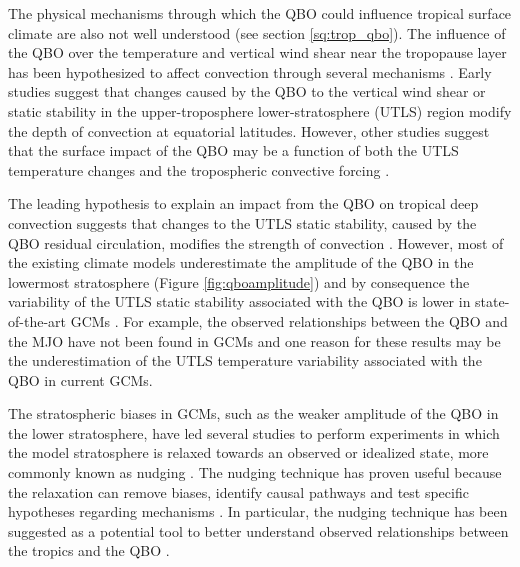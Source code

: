 The physical mechanisms through which the QBO could influence tropical surface climate are also not well understood (see section \ref{sq:trop_qbo}). The influence of the QBO over the temperature and vertical wind shear near the tropopause layer \citep{tegtmeier2020b,martin2021variability} has been hypothesized to affect convection through several mechanisms \citep{haynes2021influence}.
Early studies \citep{gray1984,collimore2003} suggest that changes caused by the QBO to the vertical wind shear or static stability in the upper-troposphere lower-stratosphere (UTLS) region  modify the depth of convection at equatorial latitudes. However, other studies suggest that the surface impact of the QBO may be a function of both the UTLS temperature changes and the tropospheric convective forcing \citep{nie2015}.

The leading hypothesis to explain an impact from the QBO on tropical deep convection suggests that changes to the  UTLS static stability, caused by the QBO residual circulation, modifies the strength of convection  \citep{collimore2003,liess2012,nie2015,yamazaki2020tropospheric}. 
However, most of the existing climate models underestimate the amplitude of the QBO in the lowermost stratosphere (Figure \ref{fig:qboamplitude}) and by consequence the variability of the UTLS static stability associated with the QBO is lower in state-of-the-art GCMs \citep{schenzinger2017,richter2020,bushell2020}. 
  For example, the observed relationships between the QBO and the MJO have not been found in GCMs \citep{lee2018,kim2020} and one reason for these results may be the underestimation of the UTLS temperature variability associated with the QBO in current GCMs.
  
   The stratospheric biases in GCMs, such as the weaker amplitude of the QBO in the lower stratosphere, have led several studies to perform experiments in which the model stratosphere is relaxed towards an observed or idealized  state, more commonly known as nudging \citep[e.g.][]{garfinkel2011,lee2018,gray2020,richter2020,martin2021}. 
The nudging technique has proven useful because the relaxation can remove biases, identify causal pathways and test specific hypotheses regarding mechanisms \citep{gray2020,martin2021,haynes2021influence}. In particular, the nudging technique has been suggested as a potential tool to better understand observed relationships between the tropics and the QBO \citep{lee2018,martin2021}.

